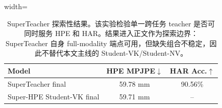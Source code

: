 \begin{table}[H]
\centering
\caption{SuperTeacher 探索性结果。该实验检验单一跨任务 teacher 是否可同时服务 HPE 和 HAR。结果进入正文作为探索边界：SuperTeacher 自身 full-modality 端点可用，但缺失组合不稳定，因此不替代本文主线的 Student-VK/Student-NV。}
\label{tab:superteacher_cn}
\scriptsize
\begin{adjustbox}{width=\linewidth}
\begin{tabular}{lcc}
\toprule
Model & HPE MPJPE$\downarrow$ & HAR Acc.$\uparrow$ \\
\midrule
SuperTeacher final & 59.78 mm & 90.56\% \\
Super-HPE Student-VK final & 59.71 mm & -- \\
\bottomrule
\end{tabular}
\end{adjustbox}
\end{table}

